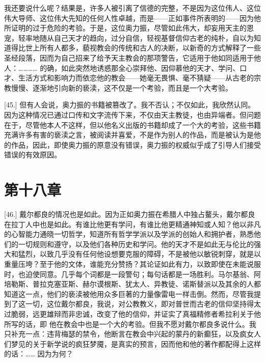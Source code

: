 我还要说什么呢？结果是，许多人被引离了信德的完整，不是因为这位伟人、这位伟大导师、这位伟大先知的任何人性卓越，而是——正如事件所表明的——因为他所证明的过于危险的考验。于是，这位奥力振，尽管如此伟大，却妄用天主的恩宠，轻率地随从自己天才的趋向，过分自信，轻视基督信仰古老的纯朴，自以为知道得比世上所有人都多，藐视教会的传统和古人的决断，以新奇的方式解释了一些圣经段落，因而为自己招来了给予天主教会的那项警告，它适用于他如同适用于他人：………… 的确，如此突然地诱惑那全心崇拜他、因仰慕他的天才、学问、口才、生活方式和影响力而依恋他的教会——她毫无畏惧、毫不猜疑——从古老的宗教慢慢、逐渐地引向新的亵渎，这不仅是一个考验，而且是一个大考验。\par

[45.] 但有人会说，奥力振的书籍被篡改了。我不否认；不仅如此，我欣然认同。因为这种情况已通过口传和文字流传下来，不仅由天主教徒，也由异端者。但问题在于，尽管他本人不这样，但以他名义出版的书籍却成了一个大的考验，这些书籍充满许多有害的亵渎之言，被阅读并喜爱，不是作为别人的作品，而是被认为是他的作品，因此，即使奥力振的原意没有错误，奥力振的权威似乎成了引导人们接受错误的有效原因。\par


\section{第十八章}

\par

[46.] 戴尔都良的情况也是如此。因为正如奥力振在希腊人中独占鳌头，戴尔都良在拉丁人中也是如此。有谁比他更有学问，有谁比他更精通神知或人知？他以非凡的心智能力通晓一切哲学，知道所有哲学学派以及学派的创始人和拥护者，熟悉他们的一切规则和遵守，以及他们各种历史和学问。他的天才不是如此无与伦比的强大和猛烈，以致几乎没有任何他设想要克服的障碍，不是被他以敏锐刺穿，就是以重量压垮？至于他的文体，谁能充分赞扬？其论证如此有力，以致即使在未能说服时，也迫使同意。几乎每个词都是一段警句；每句话都是一场胜利。马尔基翁、阿培勒斯、普拉克塞亚斯、赫尔谟根斯、犹太人、异教徒、诺斯替派以及其余的人都知道这一点，他们的亵渎被他用众多巨著的力量像雷电一样击倒。然而，尽管我提到了这一切，这位戴尔都良，我说，对公教教义，即对普世而古老的信仰坚持得太过脆弱，远更雄辩而非忠诚，改变了他的信仰，并证实了真福精修者希拉利关于他所写的话，即  他在教会中也是一个大的考验。但我不愿对戴尔都良多说什么。我只补充一点：违背梅瑟的禁令，他断言在教会中兴起的蒙丹的新癫狂，以及疯女人们梦见的关于新学说的疯狂梦魇，是真实的预言，因而他和他的著作都配得上这样的话：…… 因为为何？\par

